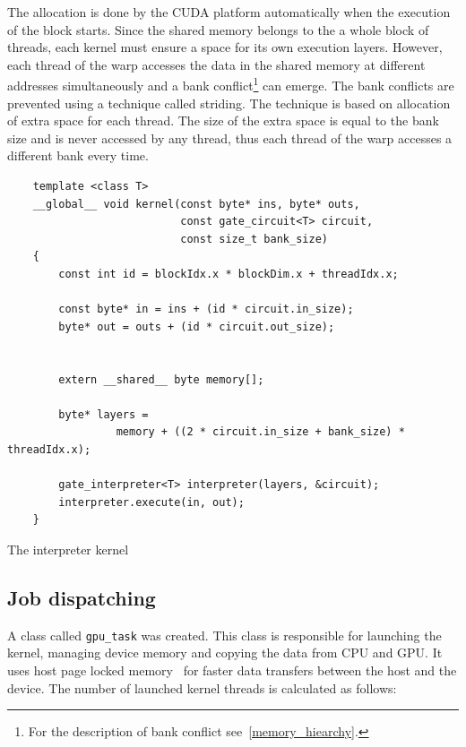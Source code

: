 \documentclass[12pt,twoside]{fithesis2}
\begin{document}
The allocation is done by the CUDA platform automatically when the execution of the block starts. Since the shared memory belongs to the a whole block of threads, each kernel must ensure a space for its own execution layers. However, each thread of the warp accesses the data in the shared memory at different addresses simultaneously and a bank conflict\footnote{For the description of bank conflict see~\ref{memory_hiearchy}.} can emerge. The bank conflicts are prevented using a technique called striding. The technique is based on allocation of extra space for each thread. The size of the extra space is equal to the bank size and is never accessed by any thread, thus each thread of the warp accesses a different bank every time.

\begin{listing}[h]
	\begin{verbatim}	
	template <class T>
	__global__ void kernel(const byte* ins, byte* outs,
	                       const gate_circuit<T> circuit,
	                       const size_t bank_size)
	{
		const int id = blockIdx.x * blockDim.x + threadIdx.x;
		
		const byte* in = ins + (id * circuit.in_size);
		byte* out = outs + (id * circuit.out_size);
		
		
		extern __shared__ byte memory[];
		
		byte* layers =
		         memory + ((2 * circuit.in_size + bank_size) * threadIdx.x);
		
		gate_interpreter<T> interpreter(layers, &circuit);
		interpreter.execute(in, out);
	}
	\end{verbatim}
	\caption{The interpreter kernel}
	\label{listing:kernel}
\end{listing}

\subsection{Job dispatching}

A class called \texttt{gpu\_task} was created. This class is responsible for launching the kernel, managing device memory and copying the data from CPU and GPU. It uses host page locked memory~\cite{cuda_guide} for faster data transfers between the host and the device. The number of launched kernel threads is calculated as follows:

\end{document}
